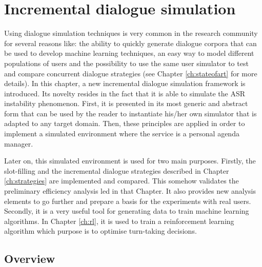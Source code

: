 \chapter{Incremental dialogue simulation}
\label{ch:simulation}

	
	Using dialogue simulation techniques is very common in the research community \cite{Eckert1997,Pietquin2013} for several reasons like: the ability to quickly generate dialogue corpora that can be used to develop machine learning techniques, an easy way to model different populations of users and the possibility to use the same user simulator to test and compare concurrent dialogue strategies (see Chapter \ref{ch:stateofart} for more details). In this chapter, a new incremental dialogue simulation framework is introduced. Its novelty resides in the fact that it is able to simulate the ASR instability phenomenon. First, it is presented in its most generic and abstract form that can be used by the reader to instantiate his/her own simulator that is adapted to any target domain. Then, these principles are applied in order to implement a simulated environment where the service is a personal agenda manager.
	
	Later on, this simulated environment is used for two main purposes. Firstly, the slot-filling and the incremental dialogue strategies described in Chapter \ref{ch:strategies} are implemented and compared. This somehow validates the preliminary efficiency analysis led in that Chapter. It also provides new analysis elements to go further and prepare a basis for the experiments with real users. Secondly, it is a very useful tool for generating data to train machine learning algorithms. In Chapter \ref{ch:rl}, it is used to train a reinforcement learning algorithm which purpose is to optimise turn-taking decisions.
						
\section{Overview}
	

